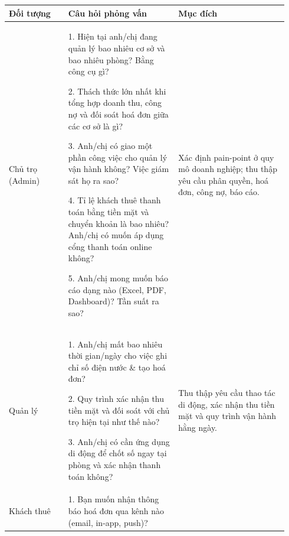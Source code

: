 \documentclass[a4paper,oneside]{report}
\begin{document}
\begin{longtable}[]{@{}>{\RaggedRight\arraybackslash}p{0.20\linewidth}>{\RaggedRight\arraybackslash}p{0.37\linewidth}>{\RaggedRight\arraybackslash}p{0.37\linewidth}@{}}
\toprule
\textbf{Đối tượng} & \textbf{Câu hỏi phỏng vấn} & \textbf{Mục
đích}\tabularnewline
\midrule
\endhead
\begin{minipage}[t]{\linewidth}\raggedright
Chủ trọ (Admin)\strut
\end{minipage} & \begin{minipage}[t]{\linewidth}\raggedright
1. Hiện tại anh/chị đang quản lý bao nhiêu cơ sở và bao nhiêu phòng?
Bằng công cụ gì?

2. Thách thức lớn nhất khi tổng hợp doanh thu, công nợ và đối soát hoá
đơn giữa các cơ sở là gì?

3. Anh/chị có giao một phần công việc cho quản lý vận hành không? Việc
giám sát họ ra sao?

4. Tỉ lệ khách thuê thanh toán bằng tiền mặt và chuyển khoản là bao
nhiêu? Anh/chị có muốn áp dụng cổng thanh toán online không?

5. Anh/chị mong muốn báo cáo dạng nào (Excel, PDF, Dashboard)? Tần suất
ra sao?\strut
\end{minipage} & \begin{minipage}[t]{\linewidth}\raggedright
Xác định pain-point ở quy mô doanh nghiệp; thu thập yêu cầu phân quyền,
hoá đơn, công nợ, báo cáo.\strut
\end{minipage}\tabularnewline
\begin{minipage}[t]{\linewidth}\raggedright
Quản lý\strut
\end{minipage} & \begin{minipage}[t]{\linewidth}\raggedright
1. Anh/chị mất bao nhiêu thời gian/ngày cho việc ghi chỉ số điện nước \&
tạo hoá đơn?

2. Quy trình xác nhận thu tiền mặt và đối soát với chủ trọ hiện tại như
thế nào?

3. Anh/chị có cần ứng dụng di động để chốt số ngay tại phòng và xác nhận
thanh toán không?\strut
\end{minipage} & \begin{minipage}[t]{\linewidth}\raggedright
Thu thập yêu cầu thao tác di động, xác nhận thu tiền mặt và quy trình
vận hành hằng ngày.\strut
\end{minipage}\tabularnewline
\begin{minipage}[t]{\linewidth}\raggedright
Khách thuê\strut
\end{minipage} & \begin{minipage}[t]{\linewidth}\raggedright
1. Bạn muốn nhận thông báo hoá đơn qua kênh nào (email, in-app, push)?


\end{minipage}
\end{longtable}
\end{document}
